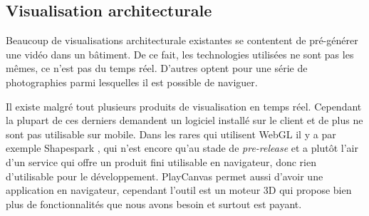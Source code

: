 \subsection{Visualisation architecturale}
Beaucoup de visualisations architecturale existantes se contentent de pré-générer une vidéo dans un bâtiment. De ce fait, les technologies utilisées ne sont pas les mêmes, ce n'est pas du temps réel. D'autres optent pour une série de photographies parmi lesquelles il est possible de naviguer. 

Il existe malgré tout plusieurs produits de visualisation en temps réel. Cependant la plupart de ces derniers demandent un logiciel installé sur le client et de plus ne sont pas utilisable sur mobile. Dans les rares qui utilisent WebGL il y a par exemple Shapespark \cite{architecture-shapespark}, qui n'est encore qu'au stade de \emph{pre-release} et a plutôt l'air d'un service qui offre un produit fini utilisable en navigateur, donc rien d'utilisable pour le développement. PlayCanvas \cite{playcanvas-architecture} permet aussi d'avoir une application en navigateur, cependant l'outil est un moteur 3D qui propose bien plus de fonctionnalités que nous avons besoin et surtout est payant.